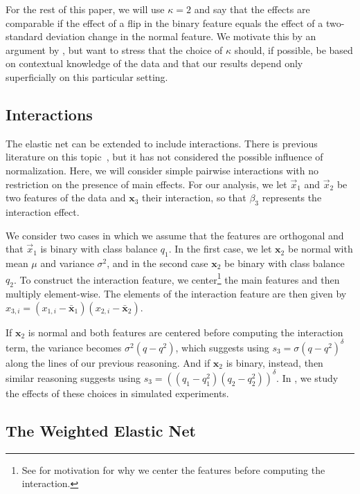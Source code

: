 For the rest of this paper, we will use \(\kappa = 2\) and say that the effects are
comparable if the effect of a flip in the binary feature equals the effect of a
two-standard deviation change in the normal feature. We motivate this by an argument by
\citet{gelman2008}, but want to stress that the choice of \(\kappa\) should, if possible,
be based on contextual knowledge of the data and that our results depend only superficially
on this particular setting.

\subsection{Interactions}\label{sec:interactions}

The elastic net can be extended to include interactions. There is previous literature on
this topic~\citep{bien2013,lim2015,zemlianskaia2022}, but it has not considered the
possible influence of normalization. Here, we will consider simple pairwise interactions
with no restriction on the presence of main effects. For our analysis, we let \(\vec{x}_1\)
and \(\vec{x}_2\) be two features of the data and \(\bm{x}_3\) their interaction, so that
\(\beta_3\) represents the interaction effect.

We consider two cases in which we assume that the features are orthogonal and that
\(\vec{x}_1\) is binary with class balance \(q_1\). In the first case, we let \(\bm{x}_2\)
be normal with mean \(\mu\) and variance \(\sigma^2\), and in the second case \(\bm{x}_2\)
be binary with class balance \(q_2\). To construct the interaction feature, we
center\footnote{See  for motivation for why we center the
  features before computing the interaction.} the main features and then multiply
element-wise. The elements of the interaction feature are then given by \(x_{3,i} =
(x_{1,i} - \bar{\bm{x}}_1)(x_{2,i} - \bar{\bm{x}}_2)\).

If \(\bm{x}_2\) is normal and both features are centered before computing the interaction
term, the variance becomes \(\sigma^2 (q-q^2)\), which suggests using \(s_3 = \sigma (q -
q^2)^\delta\) along the lines of our previous reasoning. And if \(\bm{x}_2\) is binary,
instead, then similar reasoning suggests using \(s_3 = ((q_1-q_1^2)(q_2-q_2^2))^\delta\).
In , we study the effects of these choices in simulated
experiments.

\subsection{The Weighted Elastic Net}\label{sec:binary-weighting}

